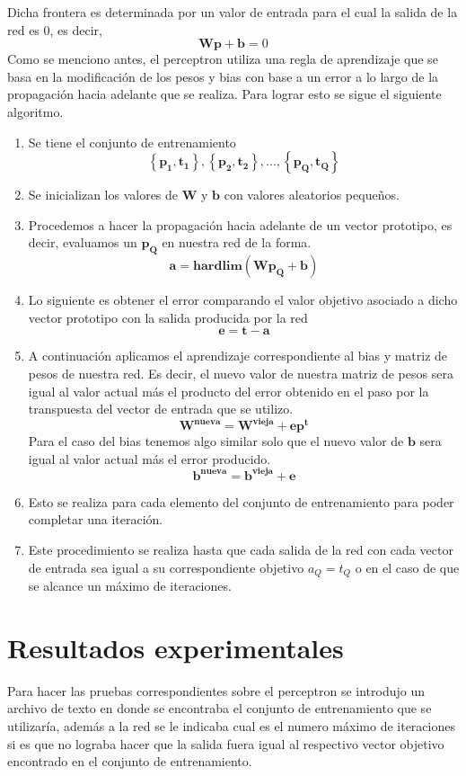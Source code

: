 \documentclass[12pt, titlepage]{article}
\begin{document}
    Dicha frontera es determinada por un valor de entrada para el cual la salida de la red es 0, es decir,
    \[\boldsymbol{Wp+b} = 0 \]
    Como se menciono antes, el perceptron utiliza una regla de aprendizaje que se basa en la modificación de los pesos y bias con base a un error a lo largo de la propagación hacia adelante que se realiza. 
    Para lograr esto se sigue el siguiente algoritmo.\cite{otro}
    \begin{enumerate}
        \item Se tiene el conjunto de entrenamiento
        \[ \left\lbrace \boldsymbol{p_1, t_1}\right\rbrace , \left\lbrace \boldsymbol{p_2, t_2}\right\rbrace , ... , \left\lbrace \boldsymbol{p_Q, t_Q}\right\rbrace\]
        \item Se inicializan los valores de $\boldsymbol{W}$ y $\boldsymbol{b}$ con valores aleatorios pequeños.
        \item Procedemos a hacer la propagación hacia adelante de un vector prototipo, es decir, evaluamos un $\boldsymbol{p_Q}$ en nuestra red de la forma.
        \[ \boldsymbol{a = hardlim(Wp_Q+b)} \]
        \item Lo siguiente es obtener el error comparando el valor objetivo asociado a dicho vector prototipo con la salida producida por la red
        \[ \boldsymbol{e=t-a} \]
        \item A continuación aplicamos el aprendizaje correspondiente al bias y matriz de pesos de nuestra red. Es decir, el nuevo valor de nuestra matriz de pesos sera igual al valor actual más el producto del error obtenido en el paso por la transpuesta del vector de entrada que se utilizo.
        \[ \boldsymbol{W^{nueva} = W^{vieja} + ep^{t}} \]
        Para el caso del bias tenemos algo similar solo que el nuevo valor de $\boldsymbol{b}$ sera igual al valor actual más el error producido.
        \[ \boldsymbol{b^{nueva} = b^{vieja} + e} \]
        \item Esto se realiza para cada elemento del conjunto de entrenamiento para poder completar una iteración.
        \item Este procedimiento se realiza hasta que cada salida de la red con cada vector de entrada sea igual a su correspondiente objetivo $a_Q = t_Q$ o en el caso de que se alcance un máximo de iteraciones.
    \end{enumerate}
\newpage
\section{Resultados experimentales}
Para hacer las pruebas correspondientes sobre el perceptron se introdujo un archivo de texto en donde se encontraba el conjunto de entrenamiento que se utilizaría, además a la red se le indicaba cual es el numero máximo de iteraciones si es que no lograba hacer que la salida fuera igual al respectivo vector objetivo encontrado en el conjunto de entrenamiento.
\end{document}

